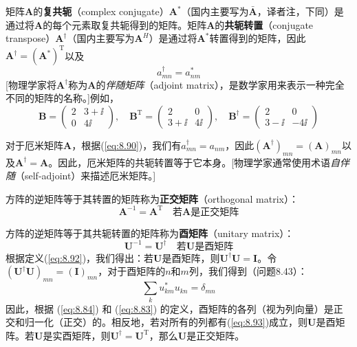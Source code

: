     矩阵$\mathbf{A}$的\textbf{复共轭}（complex conjugate）$\mathbf{A}^{\ast}$（国内主要写为$\bar{\mathbf{A}}$，译者注，下同）是通过将$\mathbf{A}$的每个元素取复共轭得到的矩阵。矩阵$\mathbf{A}$的\textbf{共轭转置}（conjugate transpose）$\mathbf{A}^{\dagger}$（国内主要写为$\mathbf{A}^H$）是通过将$\mathbf{A}^{\ast}$转置得到的矩阵，因此$\mathbf{A}^{\dagger} = \left(\mathbf{A}^{\ast}\right)^{\mathrm{T}}$以及
    \begin{equation}
        a_{mn}^{\dagger} = a_{nm}^{\ast}
        \label{eq:8.90}
    \end{equation}
    [物理学家将$\mathbf{A}^{\dagger}$称为$\mathbf{A}$的\textit{伴随矩阵}（adjoint matrix），是数学家用来表示一种完全不同的矩阵的名称。]例如，
    \begin{equation*}
        \mathbf{B} = \begin{pmatrix}
            2 & 3 + \ii \\
            0 & 4\ii 
        \end{pmatrix}, \quad \mathbf{B}^{\mathrm{T}} = \begin{pmatrix}
            2 & 0 \\
            3 + \ii & 4\ii 
        \end{pmatrix}, \quad \mathbf{B}^{\dagger} = \begin{pmatrix}
            2 & 0 \\
            3 - \ii & -4\ii 
        \end{pmatrix}
    \end{equation*}

    对于厄米矩阵$\mathbf{A}$，根据(\ref{eq:8.90})，我们有$a_{mn}^{\dagger} = a_{nm}$，因此$\left(\mathbf{A}^{\dagger}\right)_{mn} = \left(\mathbf{A}\right)_{mn}$以及$\mathbf{A}^{\dagger} = \mathbf{A}$。因此，厄米矩阵的共轭转置等于它本身。[物理学家通常使用术语\textit{自伴随}（self-adjoint）来描述厄米矩阵。] 

    方阵的逆矩阵等于其转置的矩阵称为\textbf{正交矩阵}（orthogonal matrix）：
    \begin{equation}
        \mathbf{A}^{-1} = \mathbf{A}^{\mathrm{T}} \quad \text{若} \mathbf{A} \text{是正交矩阵}
        \label{eq:8.91}
    \end{equation}

    方阵的逆矩阵等于其共轭转置的矩阵称为\textbf{酉矩阵}（unitary matrix）：
    \begin{equation}
        \mathbf{U}^{-1} = \mathbf{U}^{\dagger} \quad \text{若} \mathbf{U} \text{是酉矩阵}
        \label{eq:8.92}
    \end{equation}
    根据定义(\ref{eq:8.92})，我们得出：若$\mathbf{U}$是酉矩阵，则$\mathbf{U}^{\dagger}\mathbf{U} = \mathbf{I}$。令$\left(\mathbf{U}^{\dagger}\mathbf{U}\right)_{mn} = \left(\mathbf{I}\right)_{mn}$，对于酉矩阵的$n$和$m$列，我们得到（问题8.43）：
    \begin{equation}
        \sum_{k} u_{km}^{\ast}u_{kn} = \delta_{mn}
        \label{eq:8.93}
    \end{equation}
    因此，根据 (\ref{eq:8.84}) 和 (\ref{eq:8.83}) 的定义，酉矩阵的各列（视为列向量）是正交和归一化（正交）的。相反地，若对所有的列都有(\ref{eq:8.93})成立，则$\mathbf{U}$是酉矩阵。若$\mathbf{U}$是实酉矩阵，则$\mathbf{U}^{\dagger} = \mathbf{U}^{\mathrm{T}}$，那么$\mathbf{U}$是正交矩阵。

